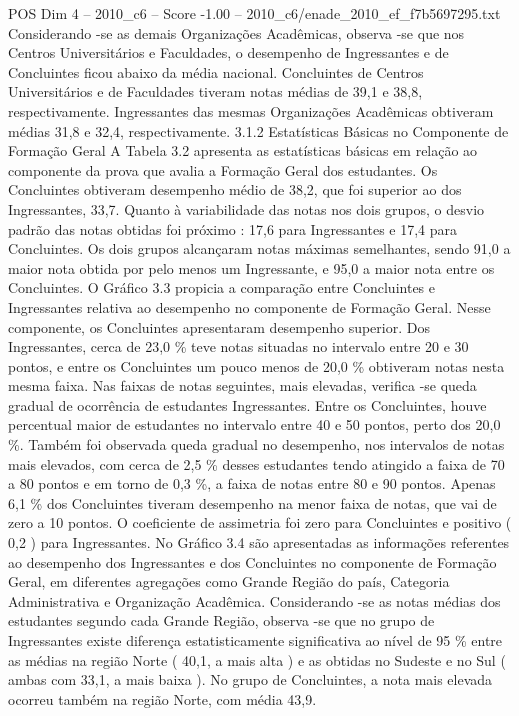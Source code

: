 \begin{textsample}{POS Dim 4 – 2010\_c6 – Score -1.00 – 2010\_c6/enade\_2010\_ef\_f7b5697295.txt}
Considerando -se as demais Organizações Acadêmicas, observa -se que nos Centros Universitários e Faculdades, o desempenho de Ingressantes e de Concluintes ficou abaixo da média nacional.
Concluintes de Centros Universitários e de Faculdades tiveram notas médias de 39,1 e 38,8, respectivamente.
Ingressantes das mesmas Organizações Acadêmicas obtiveram médias 31,8 e 32,4, respectivamente. 3.1.2 Estatísticas Básicas no Componente de Formação Geral A Tabela 3.2 apresenta as estatísticas básicas em relação ao componente da prova que avalia a Formação Geral dos estudantes.
Os Concluintes obtiveram desempenho médio de 38,2, que foi superior ao dos Ingressantes, 33,7.
Quanto à variabilidade das notas nos dois grupos, o desvio padrão das notas obtidas foi próximo : 17,6 para Ingressantes e 17,4 para Concluintes.
Os dois grupos alcançaram notas máximas semelhantes, sendo 91,0 a maior nota obtida por pelo menos um Ingressante, e 95,0 a maior nota entre os Concluintes.
O Gráfico 3.3 propicia a comparação entre Concluintes e Ingressantes relativa ao desempenho no componente de Formação Geral.
Nesse componente, os Concluintes apresentaram desempenho superior.
Dos Ingressantes, cerca de 23,0 \% teve notas situadas no intervalo entre 20 e 30 pontos, e entre os Concluintes um pouco menos de 20,0 \% obtiveram notas nesta mesma faixa.
Nas faixas de notas seguintes, mais elevadas, verifica -se queda gradual de ocorrência de estudantes Ingressantes.
Entre os Concluintes, houve percentual maior de estudantes no intervalo entre 40 e 50 pontos, perto dos 20,0 \%.
Também foi observada queda gradual no desempenho, nos intervalos de notas mais elevados, com cerca de 2,5 \% desses estudantes tendo atingido a faixa de 70 a 80 pontos e em torno de 0,3 \%, a faixa de notas entre 80 e 90 pontos.
Apenas 6,1 \% dos Concluintes tiveram desempenho na menor faixa de notas, que vai de zero a 10 pontos.
O coeficiente de assimetria foi zero para Concluintes e positivo ( 0,2 ) para Ingressantes.
No Gráfico 3.4 são apresentadas as informações referentes ao desempenho dos Ingressantes e dos Concluintes no componente de Formação Geral, em diferentes agregações como Grande Região do país, Categoria Administrativa e Organização Acadêmica.
Considerando -se as notas médias dos estudantes segundo cada Grande Região, observa -se que no grupo de Ingressantes existe diferença estatisticamente significativa ao nível de 95 \% entre as médias na região Norte ( 40,1, a mais alta ) e as obtidas no Sudeste e no Sul ( ambas com 33,1, a mais baixa ).
No grupo de Concluintes, a nota mais elevada ocorreu também na região Norte, com média 43,9.

\end{textsample}
